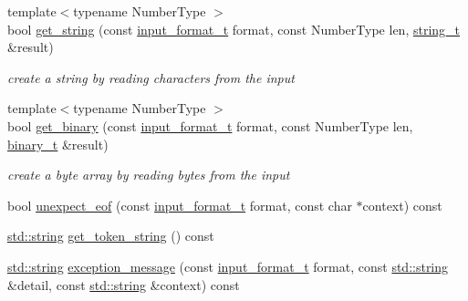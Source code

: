 \begin{DoxyCompactItemize}
\item 
{\footnotesize template$<$typename Number\+Type $>$ }\\bool \hyperlink{classnlohmann_1_1detail_1_1binary__reader_a540919db22df36512f05a88945c13263}{get\+\_\+string} (const \hyperlink{namespacenlohmann_1_1detail_aa554fc6a11519e4f347deb25a9f0db40}{input\+\_\+format\+\_\+t} format, const Number\+Type len, \hyperlink{classnlohmann_1_1detail_1_1binary__reader_a823c244e5dbf1a8edae40819f9434237}{string\+\_\+t} \&result)
\begin{DoxyCompactList}\small\item\em create a string by reading characters from the input \end{DoxyCompactList}\item 
{\footnotesize template$<$typename Number\+Type $>$ }\\bool \hyperlink{classnlohmann_1_1detail_1_1binary__reader_a55e13d567a53234573ab3833c0ca32e9}{get\+\_\+binary} (const \hyperlink{namespacenlohmann_1_1detail_aa554fc6a11519e4f347deb25a9f0db40}{input\+\_\+format\+\_\+t} format, const Number\+Type len, \hyperlink{classnlohmann_1_1detail_1_1binary__reader_acf127bb88e4147fb692edabc2a0f0663}{binary\+\_\+t} \&result)
\begin{DoxyCompactList}\small\item\em create a byte array by reading bytes from the input \end{DoxyCompactList}\item 
bool \hyperlink{classnlohmann_1_1detail_1_1binary__reader_ab5d2683b75659c3fb682bc00da317fb6}{unexpect\+\_\+eof} (const \hyperlink{namespacenlohmann_1_1detail_aa554fc6a11519e4f347deb25a9f0db40}{input\+\_\+format\+\_\+t} format, const char $\ast$context) const 
\item 
\hyperlink{namespacenlohmann_1_1detail_a1ed8fc6239da25abcaf681d30ace4985ab45cffe084dd3d20d928bee85e7b0f21}{std\+::string} \hyperlink{classnlohmann_1_1detail_1_1binary__reader_add69bd5945c790b48a9f5e66598a156b}{get\+\_\+token\+\_\+string} () const 
\item 
\hyperlink{namespacenlohmann_1_1detail_a1ed8fc6239da25abcaf681d30ace4985ab45cffe084dd3d20d928bee85e7b0f21}{std\+::string} \hyperlink{classnlohmann_1_1detail_1_1binary__reader_a02991029ac5b41a6e5900d9d25fdc6cc}{exception\+\_\+message} (const \hyperlink{namespacenlohmann_1_1detail_aa554fc6a11519e4f347deb25a9f0db40}{input\+\_\+format\+\_\+t} format, const \hyperlink{namespacenlohmann_1_1detail_a1ed8fc6239da25abcaf681d30ace4985ab45cffe084dd3d20d928bee85e7b0f21}{std\+::string} \&detail, const \hyperlink{namespacenlohmann_1_1detail_a1ed8fc6239da25abcaf681d30ace4985ab45cffe084dd3d20d928bee85e7b0f21}{std\+::string} \&context) const 
\end{DoxyCompactItemize}

